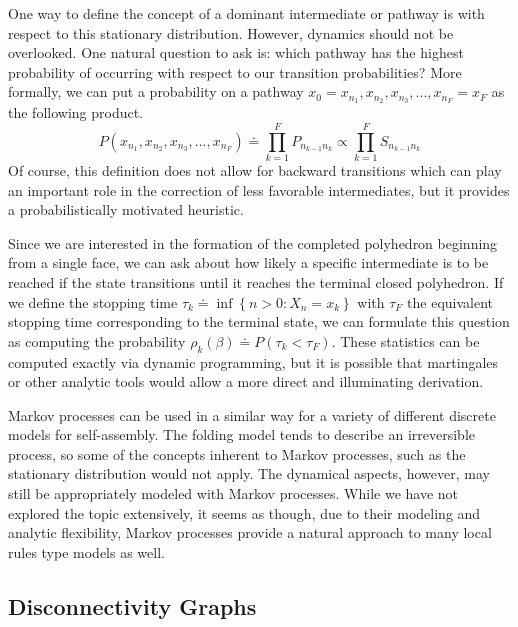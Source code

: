 \documentclass[12pt]{article}
\begin{document}
One way to define the concept of a dominant intermediate or pathway is with respect to this stationary distribution. However, dynamics should not be overlooked. One natural question to ask is: which pathway has the highest probability of occurring with respect to our transition probabilities? More formally, we can put a probability on a pathway $x_0 = x_{n_1},x_{n_2},x_{n_3},...,x_{n_F}=x_F$ as the following product. 
$$P\left(x_{n_1},x_{n_2},x_{n_3},...,x_{n_F}\right) \doteq \prod_{k=1}^F P_{n_{k-1}n_k} \propto \prod^F_{k=1}S_{n_{k-1}n_k}$$
Of course, this definition does not allow for backward transitions which can play an important role in the correction of less favorable intermediates, but it provides a probabilistically motivated heuristic. 

Since we are interested in the formation of the completed polyhedron beginning from a single face, we can ask about how likely a specific intermediate is to be reached if the state transitions until it reaches the terminal closed polyhedron. If we define the stopping time $\tau_k \doteq \inf\left\{n>0: X_n = x_k\right\}$ with $\tau_F$ the equivalent stopping time corresponding to the terminal state, we can formulate this question as computing the probability $\rho_k\left(\beta\right) \doteq P\left(\tau_k < \tau_F\right)$. These statistics can be computed exactly via dynamic programming, but it is possible that martingales or other analytic tools would allow a more direct and illuminating derivation. 

Markov processes can be used in a similar way for a variety of different discrete models for self-assembly. The folding model tends to describe an irreversible process, so some of the concepts inherent to Markov processes, such as the stationary distribution would not apply. The dynamical aspects, however, may still be appropriately modeled with Markov processes. While we have not explored the topic extensively, it seems as though, due to their modeling and analytic flexibility, Markov processes provide a natural approach to many local rules type models as well. 

\subsection{Disconnectivity Graphs}
\end{document}
